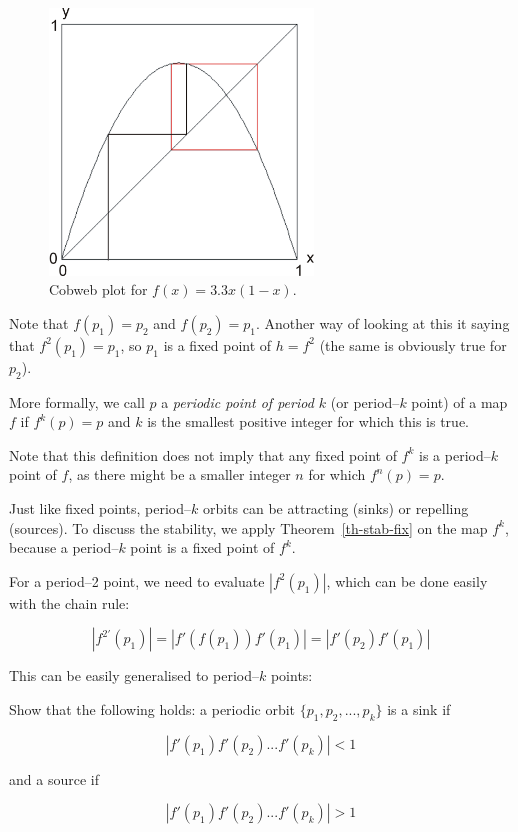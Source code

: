 \begin{figure}
\centering
\includegraphics[width=7cm]{dynamic/figures/cobweb2}
\caption{Cobweb plot for $f(x)=3.3x(1-x)$.}
\label{fig-cobweb2}
\end{figure} 

Note that $f(p_1)=p_2$ and $f(p_2)=p_1$. Another way of looking at this it saying that $f^2(p_1)=p_1$, so $p_1$ is a fixed point of $h=f^2$ (the same is obviously true for $p_2$).

More formally, we call $p$ a \emph{periodic point of period $k$} (or period--$k$ point) of a map $f$ if $f^k(p)=p$ and $k$ is the smallest positive integer for which this is true.

Note that this definition does not imply that any fixed point of $f^k$ is a period--$k$ point of $f$, as there might be a smaller integer $n$ for which $f^n(p)=p$.

Just like fixed points, period--$k$ orbits can be attracting (sinks) or repelling (sources). To discuss the stability, we apply Theorem~\ref{th-stab-fix} on the map $f^k$, because a period--$k$ point is a fixed point of $f^k$.

For a period--2 point, we need to evaluate $|f^2(p_1)|$, which can be done easily with the chain rule:

\begin{equation}
|f^{2'}(p_1)| = |f'(f(p_1)) f'(p_1)| = |f'(p_2) f'(p_1)|
\end{equation}  

This can be easily generalised to period--$k$ points:

\begin{sidebar}
\begin{ex}
Show that the following holds: a periodic orbit $\{p_1, p_2, ..., p_k\}$ is a sink if

$$|f'(p_1) f'(p_2) ... f'(p_k)| < 1$$

and a source if

$$|f'(p_1) f'(p_2) ... f'(p_k)| > 1$$

\end{ex}
\end{sidebar}

